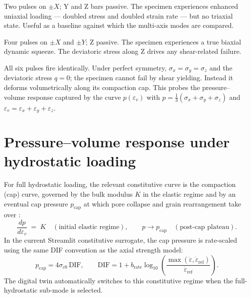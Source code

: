 \documentclass[11pt,a4paper,openany]{book}
\theoremstyle{handbook}
\newcommand{\sig}{\sigma}
\newcommand{\eps}{\varepsilon}
\newcommand{\epsdot}{\dot\eps}
\begin{document}
\begin{description}[leftmargin=2em,style=nextline]
  \item[Symmetric $\pm X$ only]
    Two pulses on $\pm X$; Y and Z bars passive. The specimen experiences
    enhanced uniaxial loading --- doubled stress and doubled strain rate
    --- but no triaxial state. Useful as a baseline against which the
    multi-axis modes are compared.
  \item[Symmetric $\pm X\pm Y$ (biaxial)]
    Four pulses on $\pm X$ and $\pm Y$; Z passive. The specimen experiences
    a true biaxial dynamic squeeze. The deviatoric stress along Z drives
    any shear-related failure.
  \item[Full hydrostatic ($\pm X,\pm Y,\pm Z$)]
    All six pulses fire identically. Under perfect symmetry,
    $\sig_x=\sig_y=\sig_z$ and the deviatoric stress $q=0$; the specimen
    cannot fail by shear yielding. Instead it deforms volumetrically along
    its compaction cap. This probes the pressure--volume response captured
    by the curve $p(\eps_v)$ with $p=\tfrac{1}{3}(\sig_x+\sig_y+\sig_z)$
    and $\eps_v=\eps_x+\eps_y+\eps_z$.
\end{description}

\section{Pressure--volume response under hydrostatic loading}

For full hydrostatic loading, the relevant constitutive curve is the
compaction (cap) curve, governed by the bulk modulus $K$ in the elastic
regime and by an eventual cap pressure $p_{\text{cap}}$ at which pore
collapse and grain rearrangement take over \cite{Schofield1980}:
\begin{equation}
  \frac{dp}{d\eps_v} \;=\; K \quad(\text{initial elastic regime}),
  \qquad p\to p_{\text{cap}} \quad(\text{post-cap plateau}).
\end{equation}
In the current Streamlit constitutive surrogate, the cap pressure is
rate-scaled using the same DIF convention as the axial strength model:
\begin{equation}
  p_{\text{cap}} = 4\sig_{c0}\,\text{DIF}, \qquad
  \text{DIF}=1+b_{\text{rate}}\log_{10}
  \!\left(\frac{\max(\epsdot,\epsdot_{\text{ref}})}
  {\epsdot_{\text{ref}}}\right).
\end{equation}
The digital twin automatically switches to this constitutive regime when
the full-hydrostatic sub-mode is selected.
\end{document}
